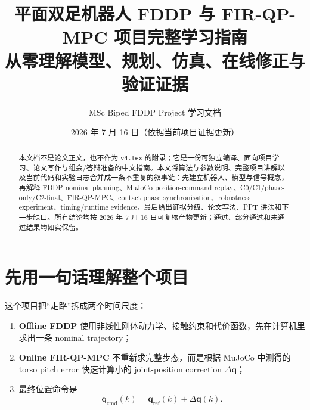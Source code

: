 \documentclass[UTF8,11pt,a4paper]{ctexart}
\title{\textbf{平面双足机器人 FDDP 与 FIR-QP-MPC 项目完整学习指南}\\[0.4em]
\large 从零理解模型、规划、仿真、在线修正与验证证据}
\author{MSc Biped FDDP Project 学习文档}
\date{2026 年 7 月 16 日（依据当前项目证据更新）}
\newcommand{\code}[1]{\texttt{#1}}
\begin{document}
\maketitle

\begin{abstract}
本文档不是论文正文，也不作为 \code{v4.tex} 的附录；它是一份可独立编译、面向项目学习、论文写作与组会/答辩准备的中文指南。本文将算法与参数说明、完整项目讲解以及当前代码和实验日志合并成一条不重复的叙事链：先建立机器人、模型与信号概念，再解释 FDDP nominal planning、MuJoCo position-command replay、C0/C1/phase-only/C2-final、FIR-QP-MPC、contact phase synchronisation、robustness experiment、timing/runtime evidence，最后给出证据分级、论文写法、PPT 讲法和下一步缺口。所有结论均按 2026 年 7 月 16 日可复核产物更新；通过、部分通过和未通过结果均如实保留。
\end{abstract}

\begin{center}
\end{center}

\tableofcontents
\clearpage

\section{先用一句话理解整个项目}\label{sec:one_sentence}

这个项目把“走路”拆成两个时间尺度：

\begin{enumerate}
  \item \textbf{Offline FDDP} 使用非线性刚体动力学、接触约束和代价函数，先在计算机里求出一条 nominal trajectory；
  \item \textbf{Online FIR-QP-MPC} 不重新求完整步态，而是根据 MuJoCo 中测得的 torso pitch error 快速计算小的 joint-position correction $\Delta\bm q$；
  \item 最终位置命令是
  \begin{equation}
      \bm q_{\mathrm{cmd}}(k)=\bm q_{\mathrm{ref}}(k)+\Delta\bm q(k).
      \label{eq:qcmd}
  \end{equation}
\end{enumerate}
\end{document}
